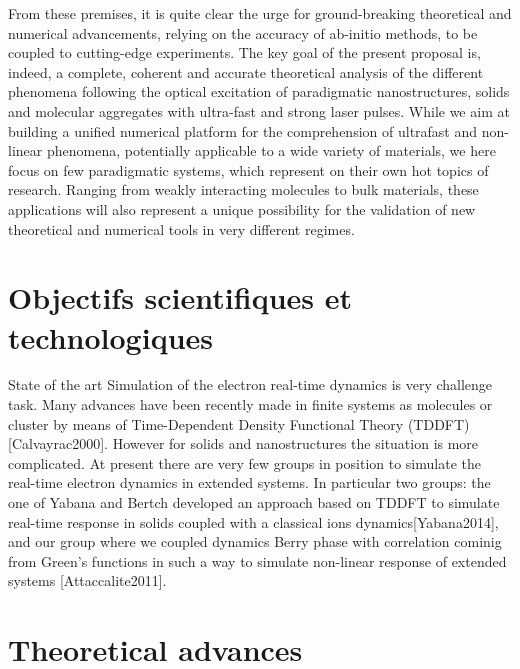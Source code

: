 From these premises, it is quite clear the urge for ground-breaking theoretical and numerical advancements, relying on the accuracy of ab-initio methods, to be coupled to cutting-edge experiments. The key goal of the present proposal is, indeed, a complete, coherent and accurate theoretical analysis of the different phenomena following the optical excitation of paradigmatic nanostructures, solids and molecular aggregates with ultra-fast and strong laser pulses. 
While we aim at building a unified numerical platform for the comprehension of ultrafast and non-linear phenomena, potentially applicable to a wide variety of materials, we here focus on few paradigmatic systems, which represent on their own hot topics of research. Ranging from weakly interacting molecules to bulk materials, these applications will also represent a unique possibility for the validation of new theoretical and numerical tools in very different regimes. 

\section{Objectifs scientifiques et technologiques}

State of the art
Simulation of the electron real-time dynamics is very challenge task. Many advances have been recently made in finite systems as molecules or cluster by means of Time-Dependent Density Functional Theory (TDDFT) [Calvayrac2000]. However for solids and  nanostructures the situation is more complicated.  At present there are very few groups in position to simulate the real-time electron dynamics  in extended systems. In particular two groups: the one of Yabana and Bertch developed an approach based on  TDDFT to simulate real-time response in solids coupled with a classical ions dynamics[Yabana2014], and our group where we coupled dynamics Berry phase with correlation cominig from Green's functions in such a way to simulate non-linear response of extended systems [Attaccalite2011].

\section{Theoretical advances}

